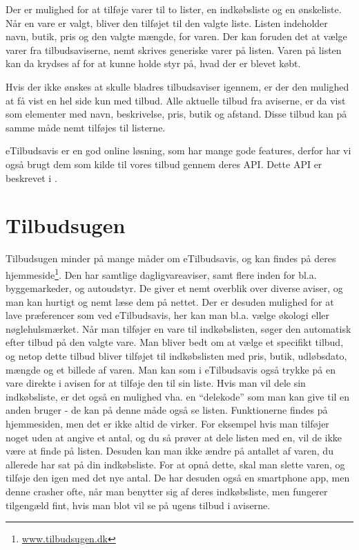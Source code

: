 Der er mulighed for at tilføje varer til to lister, en indkøbsliste og en ønskeliste. 
Når en vare er valgt, bliver den tilføjet til den valgte liste.
Listen indeholder navn, butik, pris og den valgte mængde, for varen. 
Der kan foruden det at vælge varer fra tilbudsaviserne, nemt skrives generiske varer på listen. Varen på listen kan da krydses af for at kunne holde styr på, hvad der er blevet købt.

Hvis der ikke ønskes at skulle bladres tilbudsaviser igennem, er der den mulighed at få vist en hel side kun med tilbud. 
Alle aktuelle tilbud fra aviserne, er da vist som elementer med navn, beskrivelse, pris, butik og afstand. Disse tilbud kan på samme måde nemt tilføjes til listerne.

eTilbudsavis er en god online løsning, som har mange gode features, derfor har vi også brugt dem som kilde til vores tilbud gennem deres API.
Dette API er beskrevet i .

\section{Tilbudsugen}
Tilbudsugen minder på mange måder om eTilbudsavis, og kan findes på deres hjemmeside\footnote{\underline{www.tilbudsugen.dk}}. 
Den har samtlige dagligvareaviser, samt flere inden for bl.a. byggemarkeder, og autoudstyr.
De giver et nemt overblik over diverse aviser, og man kan hurtigt og nemt læse dem på nettet. 
Der er desuden mulighed for at lave præferencer som ved eTilbudsavis, her kan man bl.a. vælge økologi eller nøglehulsmærket.
Når man tilføjer en vare til indkøbslisten, søger den automatisk efter tilbud på den valgte vare. 
Man bliver bedt om at vælge et specifikt tilbud, og netop dette tilbud bliver tilføjet til indkøbslisten med pris, butik, udløbsdato, mængde og et billede af varen.
Man kan som i eTilbudsavis også trykke på en vare direkte i avisen for at tilføje den til sin liste.
Hvis man vil dele sin indkøbsliste, er det også en mulighed vha. en ``delekode'' som man kan give til en anden bruger - de kan på denne måde også se listen.
Funktionerne findes på hjemmesiden, men det er ikke altid de virker. 
For eksempel hvis man tilføjer noget uden at angive et antal, og du så prøver at dele listen med en, vil de ikke være at finde på listen.
Desuden kan man ikke ændre på antallet af varen, du allerede har sat på din indkøbsliste. 
For at opnå dette, skal man slette varen, og tilføje den igen med det nye antal.
De har desuden også en smartphone app, men denne crasher ofte, når man benytter sig af deres indkøbsliste, men fungerer tilgengæld fint, hvis man blot vil se på ugens tilbud i aviserne.

